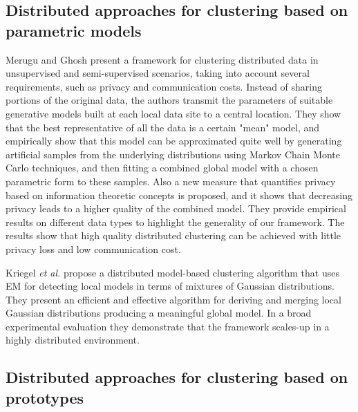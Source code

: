 \documentclass[preprint,12pt,authoryear,review]{elsarticle}
\begin{document}

\subsection{Distributed approaches for clustering based on parametric models}

Merugu and Ghosh \cite{MG03} present a framework for clustering distributed data in unsupervised and semi-supervised scenarios, taking into account several requirements, such as privacy and communication costs. Instead of sharing portions of the original data, the authors transmit the parameters of suitable generative models built at each local data site to a central location. They show that the best representative of all the data is a certain "mean" model, and empirically show that this model can be approximated quite well by generating artificial samples from the underlying distributions using Markov Chain Monte Carlo techniques, and then fitting a combined global model with a chosen parametric form to these samples. Also a new measure that quantifies privacy based on information theoretic concepts is proposed, and it shows that decreasing privacy leads to a higher quality of the combined model. They provide empirical results on different data types to highlight the generality of our framework. The results show that high quality distributed clustering can be achieved with little privacy loss and low communication cost.

Kriegel \textit{et al.} \cite{KKPS05} propose a distributed model-based clustering algorithm that uses EM for detecting local models in terms of mixtures of Gaussian distributions. They present an efficient and effective algorithm for de\-ri\-ving and merging  local Gaussian distributions producing a meaningful global model. In a broad experimental evaluation they demonstrate that the framework scales-up in a highly distributed environment.

\subsection{Distributed approaches for clustering based on prototypes}
\end{document}
